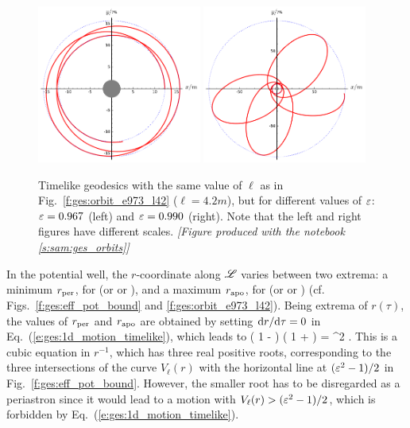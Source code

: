 \begin{figure}
\centerline{\includegraphics[width=0.48\textwidth]{ges_orbit_e967_l42.pdf}\quad
\includegraphics[width=0.48\textwidth]{ges_orbit_e990_l42.pdf}}
\caption[]{\label{f:ges:orbit_e967_990_l42} \footnotesize
Timelike geodesics with the same value of $\ell$ as in Fig.~\ref{f:ges:orbit_e973_l42} ($\ell=4.2m$), but for different values of $\varepsilon$: $\varepsilon = 0.967$ (left) and $\varepsilon=0.990$ (right).
Note that the left and right figures have different scales. \textsl{[Figure produced with the notebook \ref{s:sam:ges_orbits}]}
}
\end{figure}


In the potential well, the $r$-coordinate along $\mathscr{L}$ varies between two
extrema: a minimum $r_{\rm per}$, for  (or  or ), and
a maximum
$r_{\rm apo}$, for 
(or  or ) (cf. Figs.~\ref{f:ges:eff_pot_bound} and \ref{f:ges:orbit_e973_l42}). Being extrema of $r(\tau)$,
the values of $r_{\rm per}$ and $r_{\rm apo}$ are obtained by setting
$\mathrm{d} r /\mathrm{d}\tau =0$ in Eq.~(\ref{e:ges:1d_motion_timelike}), which leads to
\be
    \left( 1 -  \right) \left( 1 +  \right)
        = \veps^2 .
\ee
This is a cubic equation in $r^{-1}$, which has three real positive roots, corresponding
to the three intersections of the curve $V_{\ell}(r)$ with the horizontal
line at $(\varepsilon^2-1)/2$ in Fig.~\ref{f:ges:eff_pot_bound}. However, the smaller
root has to be disregarded as a periastron since it would lead to a motion with
$V_{\ell}(r) > (\varepsilon^2-1)/2$, which is forbidden by Eq.~(\ref{e:ges:1d_motion_timelike}).

